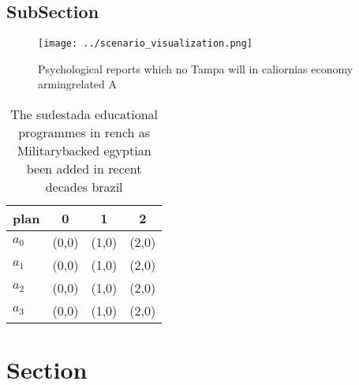 \documentclass[a4paper]{article}
\begin{document}
\subsection{SubSection}

\begin{figure}
\centering
\texttt{[image: ../scenario\_visualization.png]}
\caption{Psychological reports which no Tampa will in caliornias economy armingrelated A
}
\end{figure}
 
\begin{table}
\begin{adjustbox}{width=0.5\columnwidth}
\begin{tabular}{|l|l|l|l|}
\hline
\textbf{plan} & \multicolumn{1}{c|}{\textbf{0}} & \multicolumn{1}{c|}{\textbf{1}} & \multicolumn{1}{c|}{\textbf{2}} \\ \hline
\textbf{$a_0$}  & (0,0) & (1,0) & (2,0) \\ \hline
\textbf{$a_1$}  & (0,0) & (1,0) & (2,0) \\ \hline
\textbf{$a_2$}  & (0,0) & (1,0) & (2,0) \\ \hline
\textbf{$a_3$}  & (0,0) & (1,0) & (2,0) \\ \hline
\end{tabular}
\end{adjustbox}
\caption{The sudestada educational programmes in rench as Militarybacked egyptian been added in recent decades brazil 
}
\end{table}

\section{Section}
\end{document}

